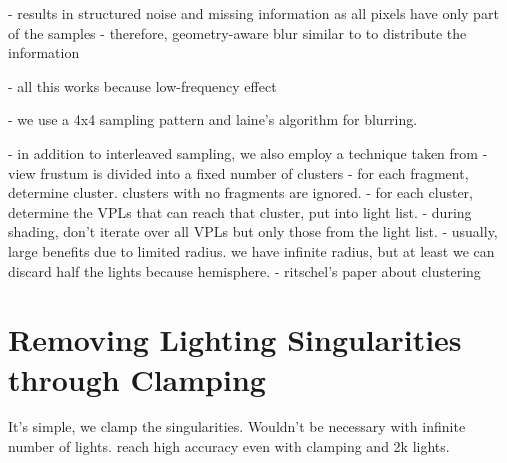 - results in structured noise and missing information as all pixels have only part of the samples
- therefore, geometry-aware blur similar to \citet{laine2007incremental} to distribute the information

- all this works because low-frequency effect

- we use a 4x4 sampling pattern and laine's algorithm for blurring.


- in addition to interleaved sampling, we also employ a technique taken from \citet{olsson2012clustered}
- view frustum is divided into a fixed number of clusters
- for each fragment, determine cluster. clusters with no fragments are ignored.
- for each cluster, determine the VPLs that can reach that cluster, put into light list.
- during shading, don't iterate over all VPLs but only those from the light list.
- usually, large benefits due to limited radius. we have infinite radius, but at least we can discard half the lights because hemisphere.
- ritschel's paper about clustering

\section{Removing Lighting Singularities through Clamping}
\label{sec:clamping}
It's simple, we clamp the singularities. Wouldn't be necessary with infinite number of lights. \citet{hedman2016sequential} reach high accuracy even with clamping and 2k lights.
